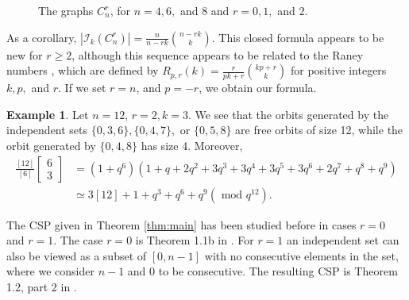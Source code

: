 \documentclass[12pt]{article}
\theoremstyle{definition}
\newtheorem{example}[theorem]{Example}
\newcommand{\gau}[2]{\left[ \begin{array}{c} #1 \\ #2 \end{array} \right]}
\begin{document}
\begin{figure}
\begin{center}
\caption{The graphs $C_n^r$, for $n=4,6,$ and $8$ and $r=0,1, $ and $2.$}
\label{fig:powercycle}
\end{center}
\end{figure}

As a corollary, $|\mathcal{I}_k(C_n^r)| = \frac{n}{n-rk}\binom{n-rk}{k}.$ This closed formula appears to be new for $r \geq 2$, although this sequence appears to be related to the Raney numbers \cite{raney}, which are defined by $R_{p,r}(k) = \frac{r}{pk+r}\binom{kp+r}{k}$ for positive integers $k, p,$ and $r$. If we set $r=n$, and $p=-r$, we obtain our formula.

\begin{example}
Let $n = 12$, $r=2, k=3$. We see that the orbits generated by the independent sets $\{0,3, 6\}, \{0,4,7\},$ or $\{0,5,8\}$ are free orbits of size 12, while the orbit generated by $\{0,4,8\}$ has size 4. Moreover, 
\begin{align*} \frac{[12]}{[6]} \gau{6}{3} & = (1+q^6)(1+q+2q^2+3q^3+3q^4+3q^5+3q^6+2q^7+q^8+q^9) \\ 
& \simeq 3[12]+1+q^3+q^6+q^9 (\mbox{ mod } q^{12}). \end{align*}
\end{example}

The CSP given in Theorem \ref{thm:main} has been studied before in cases $r=0$ and $r = 1$. The case $r=0$ is Theorem 1.1b in \cite{CSP1}. For $r=1$ an independent set can also be viewed as a subset of $[0,n-1]$ with no consecutive elements in the set, where we consider $n-1$ and $0$ to be consecutive. The resulting CSP is Theorem 1.2, part 2 in \cite{CSP3}. 
\end{document}
